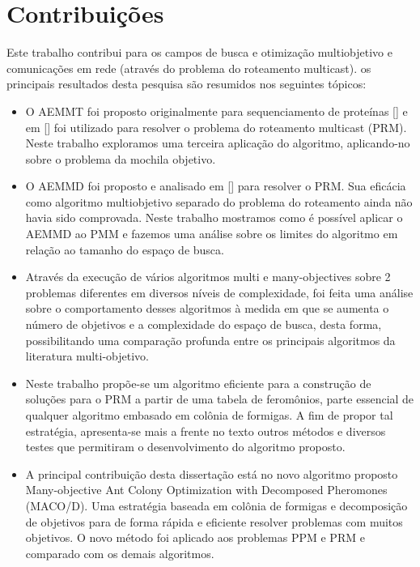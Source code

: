 
\section{Contribuições}
Este trabalho contribui para os campos de busca e otimização multiobjetivo e comunicações em rede (através do problema do roteamento multicast). os principais resultados desta pesquisa são resumidos nos seguintes tópicos:

\begin{itemize}  
	\item O AEMMT foi proposto originalmente para sequenciamento de proteínas [] e em [] foi utilizado para resolver o problema do roteamento multicast (PRM). Neste trabalho exploramos uma terceira aplicação do algoritmo, aplicando-no sobre o problema da mochila objetivo.
	\item O AEMMD foi proposto e analisado em [] para resolver o PRM. Sua eficácia como algoritmo multiobjetivo separado do problema do roteamento ainda não havia sido comprovada. Neste trabalho mostramos como é possível aplicar o AEMMD ao PMM e fazemos uma análise sobre os limites do algoritmo em relação ao tamanho do espaço de busca.
	\item Através da execução de vários algoritmos multi e many-objectives sobre 2 problemas diferentes em diversos níveis de complexidade, foi feita uma análise sobre o comportamento desses algoritmos à medida em que se aumenta o número de objetivos e a complexidade do espaço de busca, desta forma, possibilitando uma comparação profunda entre os principais algoritmos da literatura multi-objetivo.
	\item Neste trabalho propõe-se um algoritmo eficiente para a construção de soluções para o PRM a partir de uma tabela de feromônios, parte essencial de qualquer algoritmo embasado em colônia de formigas. A fim de propor tal estratégia, apresenta-se mais a frente no texto outros métodos e diversos testes que permitiram o desenvolvimento do algoritmo proposto. 
	\item A principal contribuição desta dissertação está no novo algoritmo proposto Many-objective Ant Colony Optimization with Decomposed Pheromones (MACO/D). Uma estratégia baseada em colônia de formigas e decomposição de objetivos para de forma rápida e eficiente resolver problemas com muitos objetivos. O novo método foi aplicado aos problemas PPM e PRM e comparado com os demais algoritmos.
\end{itemize}

